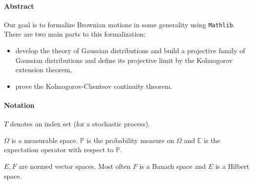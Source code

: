 %

\paragraph{Abstract}

Our goal is to formalize Brownian motions in some generality using \texttt{Mathlib}.
There are two main parts to this formalization:
\begin{itemize}
  \item develop the theory of Gaussian distributions and build a projective family of Gaussian distributions and define its projective limit by the Kolmogorov extension theorem,
  \item prove the Kolmogorov-Chentsov continuity theorem.
\end{itemize}

\paragraph{Notation}

$T$ denotes an index set (for a stochastic process).

$\Omega$ is a measurable space. $\mathbb{P}$ is the probability measure on $\Omega$ and $\mathbb{E}$ is the expectation operator with respect to $\mathbb{P}$.

$E, F$ are normed vector spaces. Most often $F$ is a Banach space and $E$ is a Hilbert space.










